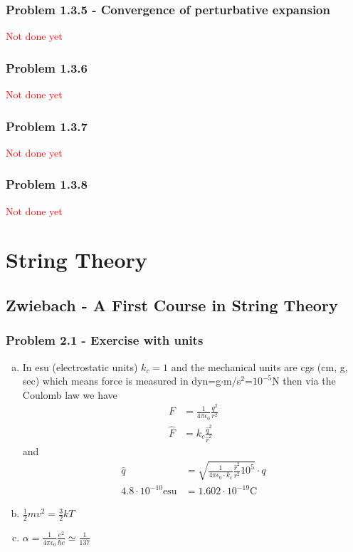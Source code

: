\documentclass[10pt,a4paper]{book}
\theoremstyle{definition}
\begin{document}
\subsection{Problem 1.3.5 - Convergence of perturbative expansion}
\textcolor{red}{Not done yet}

\subsection{Problem 1.3.6}
\textcolor{red}{Not done yet}

\subsection{Problem 1.3.7}
\textcolor{red}{Not done yet}

\subsection{Problem 1.3.8}
\textcolor{red}{Not done yet}



\chapter{String Theory}
\section{{\sc Zwiebach} - A First Course in String Theory }

\subsection{Problem 2.1 - Exercise with units}
\begin{enumerate}[(a)]
\item In esu (electrostatic units) $k_c=1$ and the mechanical units are cgs (cm, g, sec) which means force is measured in dyn=g$\cdot$m/s$^2$=$10^{-5}$N then via the Coulomb law we have
\begin{align}
F
&=\frac{1}{4\pi\epsilon_0}\frac{q^2}{r^2}\\
\hat F&=k_c\frac{\hat q^2}{\hat r^2}
\end{align}
and
\begin{align}
\hat q
&=\sqrt{\frac{1}{4\pi\epsilon_0\cdot k_c}\frac{\hat r^2}{r^2}10^5}\cdot q\\
4.8\cdot10^{-10}\text{esu}&=1.602\cdot10^{-19}\text{C}
\end{align}


\item $\frac{1}{2}mv^2=\frac{3}{2}kT$
\item $\alpha=\frac{1}{4\pi\epsilon_0}\frac{e^2}{\hbar c}\simeq\frac{1}{137}$
\end{enumerate}
\end{document}
